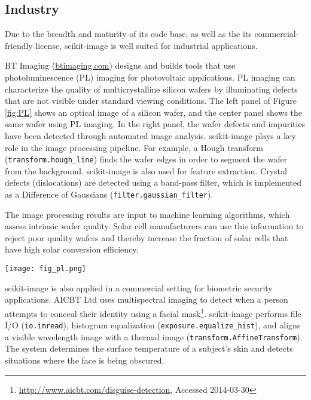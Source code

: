 
  \subsection*{Industry}
    \label{industry}

    Due to the breadth and maturity of its code base, as well as the its commercial-friendly license, scikit-image is well suited for industrial applications.

    BT Imaging (\url{btimaging.com}) designs and builds tools that use photoluminescence (PL) imaging for photovoltaic applications. PL imaging can characterize the quality of multicrystalline silicon wafers by illuminating defects that are not visible under standard viewing conditions. The left panel of Figure \ref{fig:PL} shows an optical image of a silicon wafer, and the center panel shows the same wafer using PL imaging. In the right panel, the wafer defects and impurities have been detected through automated image analysis. scikit-image plays a key role in the image processing pipeline. For example, a Hough transform (\texttt{transform.hough\_line}) finds the wafer edges in order to segment the wafer from the background. scikit-image is also used for feature extraction. Crystal defects (dislocations) are detected using a band-pass filter, which is implemented as a Difference of Gaussians (\texttt{filter.gaussian\_filter}).

    The image processing results are input to machine learning algorithms, which assess intrinsic wafer quality. Solar cell manufacturers can use this information to reject poor quality wafers and thereby increase the fraction of solar cells that have high solar conversion efficiency.

    \begin{figure*}[bht]

      \texttt{[image: fig\_pl.png]}

      \caption{\textit{Left}: An image of an as-cut silicon wafer before it has been processed into a solar cell. \textit{Center}: A PL image of the same wafer. Wafer defects, which have a negative impact solar cell efficiency, are visible as dark regions. \textit{Right}: Image processing results. Defects in the crystal growth (dislocations) are colored blue, while red indicates the presence of impurities. \label{fig:PL}}
    \end{figure*}

    scikit-image is also applied in a commercial setting for biometric security applications. AICBT Ltd uses multispectral imaging to detect when a person attempts to conceal their identity using a facial mask\footnote{\url{http://www.aicbt.com/disguise-detection}, Accessed 2014-03-30}. scikit-image performs file I/O (\texttt{io.imread}), histogram equalization (\texttt{exposure.equalize\_hist}), and aligns a visible wavelength image with a thermal image (\texttt{transform.AffineTransform}). The system determines the surface temperature of a subject's skin and detects situations where the face is being obscured.
